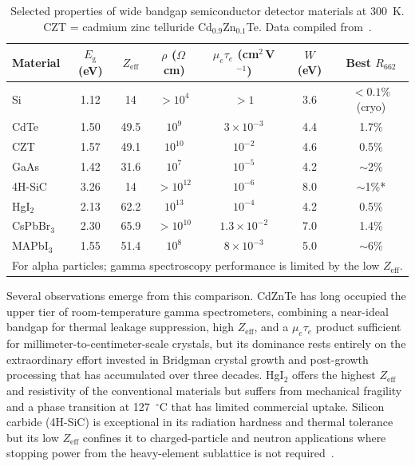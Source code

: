 \begin{table}[htbp]
\centering
\caption{Selected properties of wide bandgap semiconductor detector
         materials at 300~K.  CZT = cadmium zinc telluride
         Cd$_{0.9}$Zn$_{0.1}$Te. Data compiled
         from~\cite{Owens2004,He_NatPhoton_2021,Springer_CsPbBr3,knoll2010}.}
\label{tab:wbg_comparison}
\startsinglespace
\begin{tabular}{lcccccc}
\hline
Material & $E_{\mathrm{g}}$ (eV) & $Z_{\mathrm{eff}}$ &
  $\rho$ ($\Omega$\,cm) & $\mu_e\tau_e$ (cm$^2$\,V$^{-1}$) &
  $W$ (eV) & Best $R_{662}$ \\
\hline
Si          & 1.12 & 14   & $>10^4$   & $>1$                  & 3.6  & $<0.1$\% (cryo) \\
CdTe        & 1.50 & 49.5 & $10^9$    & $3\times10^{-3}$      & 4.4  & 1.7\% \\
CZT         & 1.57 & 49.1 & $10^{10}$ & $10^{-2}$             & 4.6  & 0.5\% \\
GaAs        & 1.42 & 31.6 & $10^7$    & $10^{-5}$             & 4.2  & $\sim$2\% \\
4H-SiC      & 3.26 & 14   & $>10^{12}$& $10^{-6}$             & 8.0  & $\sim$1\%* \\
HgI$_2$     & 2.13 & 62.2 & $10^{13}$ & $10^{-4}$             & 4.2  & 0.5\% \\
CsPbBr$_3$  & 2.30 & 65.9 & $>10^{10}$& $1.3\times10^{-2}$   & 7.0  & 1.4\% \\
MAPbI$_3$   & 1.55 & 51.4 & $10^8$    & $8\times10^{-3}$      & 5.0  & $\sim$6\% \\
\hline
\multicolumn{7}{l}{\footnotesize *For alpha particles; gamma spectroscopy
  performance is limited by the low $Z_{\mathrm{eff}}$.}
\end{tabular}
\end{table}

Several observations emerge from this comparison.  CdZnTe has long
occupied the upper tier of room-temperature gamma spectrometers, combining
a near-ideal bandgap for thermal leakage suppression, high $Z_{\mathrm{eff}}$,
and a $\mu_e\tau_e$ product sufficient for millimeter-to-centimeter-scale
crystals, but its dominance rests entirely on the extraordinary effort
invested in Bridgman crystal growth and post-growth processing that has
accumulated over three decades.  HgI$_2$ offers the highest $Z_{\mathrm{eff}}$
and resistivity of the conventional materials but suffers from mechanical
fragility and a phase transition at 127~$^\circ$C that has limited
commercial uptake.  Silicon carbide (4H-SiC) is exceptional in its
radiation hardness and thermal tolerance but its low $Z_{\mathrm{eff}}$
confines it to charged-particle and neutron applications where stopping
power from the heavy-element sublattice is not required~\cite{Owens2004}.

